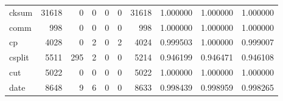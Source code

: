 \begin{longtable}{lrrrrrrrrr}
cksum     &                               31618 &                                               0 &                                              0 &                                             0 &                                              0 &                                        31618 &                                           1.000000 &                               1.000000 &                             1.000000 \\
comm      &                                 998 &                                               0 &                                              0 &                                             0 &                                              0 &                                          998 &                                           1.000000 &                               1.000000 &                             1.000000 \\
cp        &                                4028 &                                               0 &                                              2 &                                             0 &                                              2 &                                         4024 &                                           0.999503 &                               1.000000 &                             0.999007 \\
csplit    &                                5511 &                                             295 &                                              2 &                                             0 &                                              0 &                                         5214 &                                           0.946199 &                               0.946471 &                             0.946108 \\
cut       &                                5022 &                                               0 &                                              0 &                                             0 &                                              0 &                                         5022 &                                           1.000000 &                               1.000000 &                             1.000000 \\
date      &                                8648 &                                               9 &                                              6 &                                             0 &                                              0 &                                         8633 &                                           0.998439 &                               0.998959 &                             0.998265 \\

\end{longtable}
